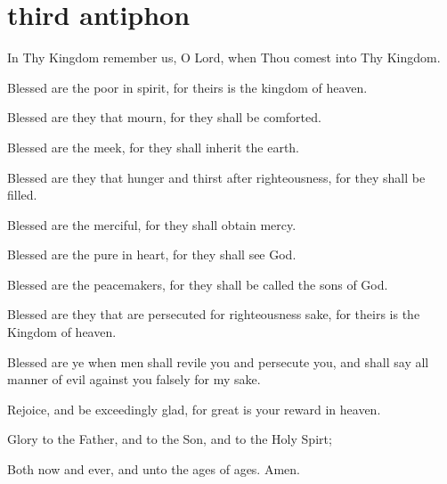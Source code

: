 \section{third antiphon}

\begin{liturgicaltext}
    \choir In Thy Kingdom remember us, O Lord, when Thou comest into Thy Kingdom.
    \item[] Blessed are the poor in spirit, for theirs is the kingdom of heaven.
    \item[] Blessed are they that mourn, for they shall be comforted.
    \item[] Blessed are the meek, for they shall inherit the earth.
    \item[] Blessed are they that hunger and thirst after righteousness, for they shall be filled.
    \item[] Blessed are the merciful, for they shall obtain mercy.
    \item[] Blessed are the pure in heart, for they shall see God.
    \item[] Blessed are the peacemakers, for they shall be called the sons of God.
    \item[] Blessed are they that are persecuted for righteousness sake, for theirs is the Kingdom of heaven.
    \item[] Blessed are ye when men shall revile you and persecute you, and shall say all manner of evil against you falsely for my sake.
    \item[] Rejoice, and be exceedingly glad, for great is your reward in heaven.
    \item[] Glory to the Father, and to the Son, and to the Holy Spirt;
    \item[] Both now and ever, and unto the ages of ages. Amen.
\end{liturgicaltext}

